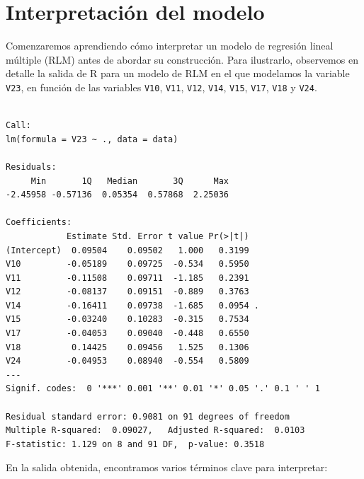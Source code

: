 \documentclass[
  spanish,
  a4paper,
]{scrbook}
\begin{document}
\section{Interpretación del modelo}\label{interpretaciuxf3n-del-modelo}

Comenzaremos aprendiendo cómo interpretar un modelo de regresión lineal
múltiple (RLM) antes de abordar su construcción. Para ilustrarlo,
observemos en detalle la salida de R para un modelo de RLM en el que
modelamos la variable \texttt{V23}, en función de las variables
\texttt{V10}, \texttt{V11}, \texttt{V12}, \texttt{V14}, \texttt{V15},
\texttt{V17}, \texttt{V18} y \texttt{V24}.

\begin{verbatim}

Call:
lm(formula = V23 ~ ., data = data)

Residuals:
     Min       1Q   Median       3Q      Max 
-2.45958 -0.57136  0.05354  0.57868  2.25036 

Coefficients:
            Estimate Std. Error t value Pr(>|t|)  
(Intercept)  0.09504    0.09502   1.000   0.3199  
V10         -0.05189    0.09725  -0.534   0.5950  
V11         -0.11508    0.09711  -1.185   0.2391  
V12         -0.08137    0.09151  -0.889   0.3763  
V14         -0.16411    0.09738  -1.685   0.0954 .
V15         -0.03240    0.10283  -0.315   0.7534  
V17         -0.04053    0.09040  -0.448   0.6550  
V18          0.14425    0.09456   1.525   0.1306  
V24         -0.04953    0.08940  -0.554   0.5809  
---
Signif. codes:  0 '***' 0.001 '**' 0.01 '*' 0.05 '.' 0.1 ' ' 1

Residual standard error: 0.9081 on 91 degrees of freedom
Multiple R-squared:  0.09027,   Adjusted R-squared:  0.0103 
F-statistic: 1.129 on 8 and 91 DF,  p-value: 0.3518
\end{verbatim}

En la salida obtenida, encontramos varios términos clave para
interpretar:
\end{document}

